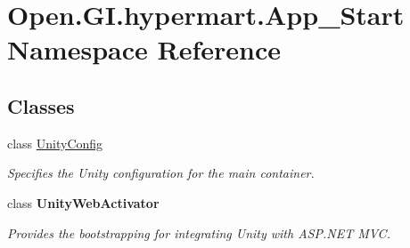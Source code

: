 \hypertarget{namespace_open_1_1_g_i_1_1hypermart_1_1_app___start}{}\section{Open.\+G\+I.\+hypermart.\+App\+\_\+\+Start Namespace Reference}
\label{namespace_open_1_1_g_i_1_1hypermart_1_1_app___start}
\subsection*{Classes}
\begin{DoxyCompactItemize}
\item 
class \hyperlink{class_open_1_1_g_i_1_1hypermart_1_1_app___start_1_1_unity_config}{Unity\+Config}
\begin{DoxyCompactList}\small\item\em Specifies the Unity configuration for the main container. \end{DoxyCompactList}\item 
class {\bfseries Unity\+Web\+Activator}
\begin{DoxyCompactList}\small\item\em Provides the bootstrapping for integrating Unity with A\+S\+P.\+N\+ET M\+VC.\end{DoxyCompactList}\end{DoxyCompactItemize}
